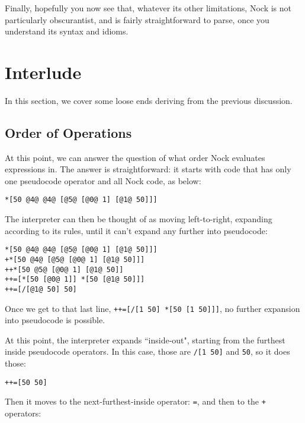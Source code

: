 \documentclass[twoside]{article}
\begin{document}
Finally, hopefully you now see that, whatever its other limitations, Nock is not particularly obscurantist, and is fairly straightforward to parse, once you understand its syntax and idioms.

\section{Interlude}

In this section, we cover some loose ends deriving from the previous discussion.

\subsection{Order of Operations}

At this point, we can answer the question of what order Nock evaluates expressions in.  The answer is straightforward: it starts with code that has only one pseudocode operator and all Nock code, as below:

\begin{lstlisting}[style=listingcode]
*[50 @4@ @4@ [@5@ [@0@ 1] [@1@ 50]]]
\end{lstlisting}

\noindent{}
The interpreter can then be thought of as moving left-to-right, expanding according to its rules, until it can't expand any further into pseudocode:

\begin{lstlisting}[style=listingcode]
*[50 @4@ @4@ [@5@ [@0@ 1] [@1@ 50]]]
+*[50 @4@ [@5@ [@0@ 1] [@1@ 50]]]
++*[50 @5@ [@0@ 1] [@1@ 50]]
++=[*[50 [@0@ 1]] *[50 [@1@ 50]]]
++=[/[@1@ 50] 50]
\end{lstlisting}

\noindent{}
Once we get to that last line, \lstinline[style=inlinecode]{++=[/[1 50] *[50 [1 50]]]}, no further expansion into pseudocode is possible.

At this point, the interpreter expands ``inside-out", starting from the furthest inside pseudocode operators. In this case, those are \lstinline[style=inlinecode]{/[1 50]} and \lstinline[style=inlinecode]{50}, so it does those:

\begin{lstlisting}[style=listingcode]
++=[50 50]
\end{lstlisting}

\noindent{}
Then it moves to the next-furthest-inside operator: \lstinline[style=inlinecode]{=}, and then to the \lstinline[style=inlinecode]{+} operators:
\end{document}
